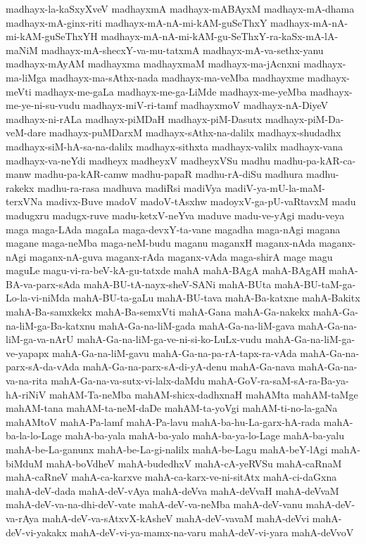 {madhayx-la-kaSxyXveV
madhayxmA
madhayx-mABAyxM
madhayx-mA-dhama
madhayx-mA-ginx-riti
madhayx-mA-nA-mi-kAM-guSeThxY
madhayx-mA-nA-mi-kAM-guSeThxYH
madhayx-mA-nA-mi-kAM-gu-SeThxY-ra-kaSx-mA-lA-maNiM
madhayx-mA-shecxY-va-mu-tatxmA
madhayx-mA-va-sethx-yanu
madhayx-mAyAM
madhayxma
madhayxmaM
madhayx-ma-jAcnxni
madhayx-ma-liMga
madhayx-ma-sAthx-nada
madhayx-ma-veMba
madhayxme
madhayx-meVti
madhayx-me-gaLa
madhayx-me-ga-LiMde
madhayx-me-yeMba
madhayx-me-ye-ni-su-vudu
madhayx-miV-ri-tamf
madhayxmoV
madhayx-nA-DiyeV
madhayx-ni-rALa
madhayx-piMDaH
madhayx-piM-Dasutx
madhayx-piM-Da-veM-dare
madhayx-puMDarxM
madhayx-sAthx-na-dalilx
madhayx-shudadhx
madhayx-siM-hA-sa-na-dalilx
madhayx-sithxta
madhayx-valilx
madhayx-vana
madhayx-va-neYdi
madheyx
madheyxV
madheyxVSu
madhu
madhu-pa-kAR-ca-manw
madhu-pa-kAR-camw
madhu-papaR
madhu-rA-diSu
madhura
madhu-rakekx
madhu-ra-rasa
madhuva
madiRsi
madiVya
madiV-ya-mU-la-maM-terxVNa
madivx-Buve
madoV
madoV-tAsxhw
madoyxV-ga-pU-vaRtavxM
madu
madugxru
madugx-ruve
madu-ketxV-neYva
maduve
madu-ve-yAgi
madu-veya
maga
maga-LAda
magaLa
maga-devxY-ta-vane
magadha
maga-nAgi
magana
magane
maga-neMba
maga-neM-budu
maganu
maganxH
maganx-nAda
maganx-nAgi
maganx-nA-guva
maganx-rAda
maganx-vAda
maga-shirA
mage
magu
maguLe
magu-vi-ra-beV-kA-gu-tatxde
mahA
mahA-BAgA
mahA-BAgAH
mahA-BA-va-parx-sAda
mahA-BU-tA-nayx-sheV-SANi
mahA-BUta
mahA-BU-taM-ga-Lo-la-vi-niMda
mahA-BU-ta-gaLu
mahA-BU-tava
mahA-Ba-katxne
mahA-Bakitx
mahA-Ba-samxkekx
mahA-Ba-semxVti
mahA-Gana
mahA-Ga-nakekx
mahA-Ga-na-liM-ga-Ba-katxnu
mahA-Ga-na-liM-gada
mahA-Ga-na-liM-gava
mahA-Ga-na-liM-ga-va-nArU
mahA-Ga-na-liM-ga-ve-ni-si-ko-LuLx-vudu
mahA-Ga-na-liM-ga-ve-yapapx
mahA-Ga-na-liM-gavu
mahA-Ga-na-pa-rA-tapx-ra-vAda
mahA-Ga-na-parx-sA-da-vAda
mahA-Ga-na-parx-sA-di-yA-denu
mahA-Ga-nava
mahA-Ga-na-va-na-rita
mahA-Ga-na-va-sutx-vi-lalx-daMdu
mahA-GoV-ra-saM-sA-ra-Ba-ya-hA-riNiV
mahAM-Ta-neMba
mahAM-shicx-dadhxnaH
mahAMta
mahAM-taMge
mahAM-tana
mahAM-ta-neM-daDe
mahAM-ta-yoVgi
mahAM-ti-no-la-gaNa
mahAMtoV
mahA-Pa-lamf
mahA-Pa-lavu
mahA-ba-hu-La-garx-hA-rada
mahA-ba-la-lo-Lage
mahA-ba-yala
mahA-ba-yalo
mahA-ba-ya-lo-Lage
mahA-ba-yalu
mahA-be-La-ganunx
mahA-be-La-gi-nalilx
mahA-be-Lagu
mahA-beY-lAgi
mahA-biMduM
mahA-boVdheV
mahA-budedhxV
mahA-cA-yeRVSu
mahA-caRnaM
mahA-caRneV
mahA-ca-karxve
mahA-ca-karx-ve-ni-sitAtx
mahA-ci-daGxna
mahA-deV-dada
mahA-deV-vAya
mahA-deVva
mahA-deVvaH
mahA-deVvaM
mahA-deV-va-na-dhi-deV-vate
mahA-deV-va-neMba
mahA-deV-vanu
mahA-deV-va-rAya
mahA-deV-va-sAtxvX-kAsheV
mahA-deV-vavaM
mahA-deVvi
mahA-deV-vi-yakakx
mahA-deV-vi-ya-mamx-na-varu
mahA-deV-vi-yara
mahA-deVvoV
}
